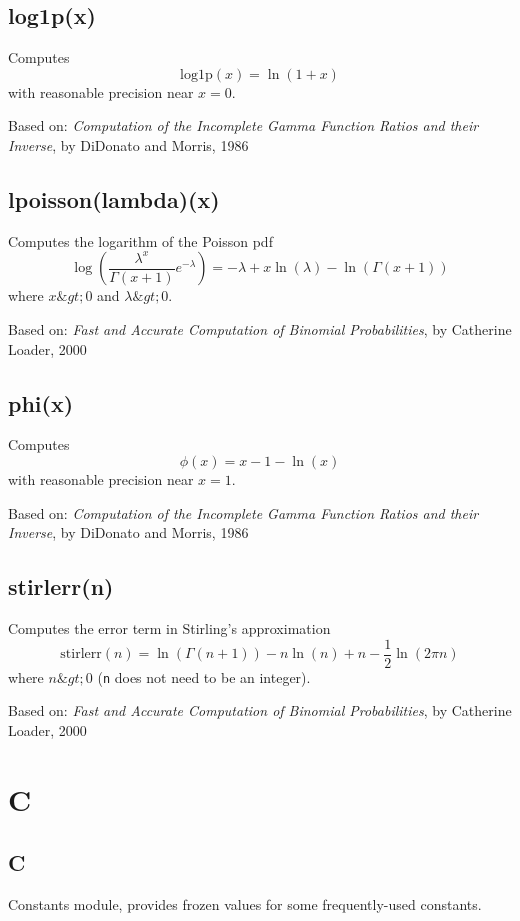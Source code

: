 \documentclass{article}
\begin{document}
    \subsection*{log1p(x)}
    Computes $$\textrm{log1p}(x) = \ln(1+x)$$ with reasonable precision near $x = 0$.


Based on:  \emph{Computation of the Incomplete Gamma Function Ratios
and their Inverse}, by DiDonato and Morris, 1986


    \subsection*{lpoisson(lambda)(x)}
    Computes the logarithm of the Poisson pdf
$$\log\left(\frac{\lambda^x}{\Gamma(x+1)}e^{-\lambda}\right)
= -\lambda + x \ln(\lambda) - \ln(\Gamma(x+1))$$
where $x\&gt;0$ and $\lambda\&gt;0$.


Based on:  \emph{Fast and Accurate Computation of Binomial Probabilities},
by Catherine Loader, 2000


    \subsection*{phi(x)}
    Computes $$\phi(x) = x - 1 - \ln(x)$$ with reasonable precision
near $x = 1$.


Based on:  \emph{Computation of the Incomplete Gamma Function Ratios
and their Inverse}, by DiDonato and Morris, 1986


    \subsection*{stirlerr(n)}
    Computes the error term in Stirling's approximation
$$\textrm{stirlerr}(n) = \ln(\Gamma(n+1)) - n \ln(n) + n - \frac{1}{2} \ln\left(2\pi n\right)$$
where $n\&gt;0$ (\texttt{n} does not need to be an integer).


Based on:  \emph{Fast and Accurate Computation of Binomial Probabilities},
by Catherine Loader, 2000


  \section{C}
    \subsection*{C}
    Constants module, provides frozen values for some frequently-used constants.
\end{document}
